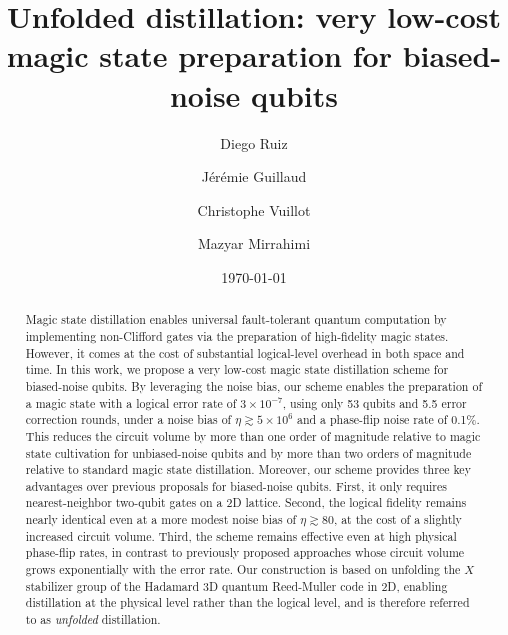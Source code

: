 \documentclass[%
 reprint,
superscriptaddress,
 amsmath,amssymb,
 aps,
]{revtex4-2}
\begin{document}
\title{Unfolded distillation: very low-cost magic state preparation for biased-noise qubits}

\author{Diego Ruiz}
%
\author{J\'erémie Guillaud}%
\author{Christophe Vuillot}%
\author{Mazyar Mirrahimi}%

\date{\today}%

\begin{abstract}
Magic state distillation enables universal fault-tolerant quantum computation by implementing non-Clifford gates via the preparation of high-fidelity magic states. However, it comes at the cost of substantial logical-level overhead in both space and time. In this work, we propose a very low-cost magic state distillation scheme for biased-noise qubits. By leveraging the noise bias, our scheme enables the preparation of a magic state with a logical error rate of $3 \times 10^{-7}$, using only 53 qubits and 5.5 error correction rounds, under a noise bias of $\eta \gtrsim 5 \times 10^6$ and a phase-flip noise rate of 0.1\%. This reduces the circuit volume by more than one order of magnitude relative to magic state cultivation for unbiased-noise qubits and by more than two orders of magnitude relative to standard magic state distillation. Moreover, our scheme provides three key advantages over previous proposals for biased-noise qubits. First, it only requires nearest-neighbor two-qubit gates on a 2D lattice. Second, the logical fidelity remains nearly identical even at a more modest noise bias of $\eta \gtrsim 80$, at the cost of a slightly increased circuit volume. Third, the scheme remains effective even at high physical phase-flip rates, in contrast to previously proposed approaches whose circuit volume grows exponentially with the error rate. Our construction is based on unfolding the $X$ stabilizer group of the Hadamard 3D quantum Reed-Muller code in 2D, enabling distillation at the physical level rather than the logical level, and is therefore referred to as \textit{unfolded} distillation.
\end{abstract}
\end{document}
